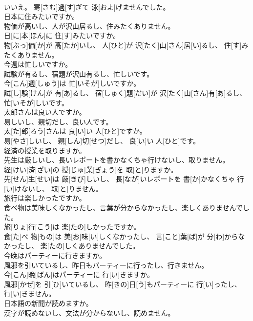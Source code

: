 \documentclass[8pt]{extreport}
\begin{document}
\begin{CJK}{UTF8}{min}
\\	いいえ。 寒[さむ]過[す]ぎて 泳[およ]げませんでした。
\\	日本に住みたいですか。 
\\	物価が高いし、人が沢山居るし、住みたくありません。	
\\	日[に]本[ほん]に 住[す]みたいですか。 
\\	物[ぶっ]価[か]が 高[たか]いし、 人[ひと]が 沢[たく]山[さん]居[い]るし、 住[す]みたくありません。
\\	今週は忙しいですか。 
\\	試験が有るし、宿題が沢山有るし、忙しいです。	
\\	今[こん]週[しゅう]は 忙[いそが]しいですか。 
\\	試[し]験[けん]が 有[あ]るし、 宿[しゅく]題[だい]が 沢[たく]山[さん]有[あ]るし、 忙[いそが]しいです。
\\	太郎さんは良い人ですか。 
\\	易しいし、親切だし、良い人です。	
\\	太[た]郎[ろう]さんは 良[い]い 人[ひと]ですか。 
\\	易[やさ]しいし、 親[しん]切[せつ]だし、 良[い]い 人[ひと]です。
\\	経済の授業を取りますか。 
\\	先生は厳しいし、長いレポートを書かなくちゃ行けないし、取りません。	
\\	経[けい]済[ざい]の 授[じゅ]業[ぎょう]を 取[と]りますか。 
\\	先[せん]生[せい]は 厳[きび]しいし、 長[なが]いレポートを 書[か]かなくちゃ 行[い]けないし、 取[と]りません。
\\	旅行は楽しかったですか。 
\\	食べ物は美味しくなかったし、言葉が分からなかったし、楽しくありませんでした。	
\\	旅[りょ]行[こう]は 楽[たの]しかったですか。 
\\	食[た]べ 物[もの]は 美[お]味[い]しくなかったし、 言[こと]葉[ば]が 分[わ]からなかったし、 楽[たの]しくありませんでした。
\\	今晩はパーティーに行きますか。 
\\	風邪を引いているし、昨日もパーティーに行ったし、行きません。	
\\	今[こん]晩[ばん]はパーティーに 行[い]きますか。 
\\	風邪[かぜ]を 引[ひ]いているし、 昨[きの]日[う]もパーティーに 行[い]ったし、 行[い]きません。
\\	日本語の新聞が読めますか。 
\\	漢字が読めないし、文法が分からないし、読めません。	

\end{CJK}
\end{document}
